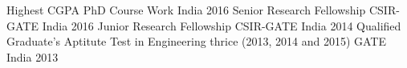


\begin{cvhonors}

  \cvhonor
    {Highest CGPA} %
    {PhD Course Work} %
    {India} %
    {2016} %
  \cvhonor
    {Senior Research Fellowship} %
    {CSIR-GATE} %
    {India} %
    {2016} %
  \cvhonor
    {Junior Research Fellowship} %
    {CSIR-GATE} %
    {India} %
    {2014} %
  \cvhonor
    {Qualified Graduate's Aptitute Test in Engineering thrice (2013, 2014 and 2015)} %
    {GATE} %
    {India} %
    {2013} %
  
\end{cvhonors}